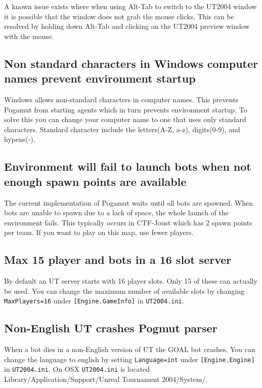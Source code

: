 \documentclass[11pt,a4paper]{article}
\begin{document}
A known issue exists where when using Alt-Tab to switch to the UT2004 window it is possible that the window does not grab the mouse clicks. This can be resolved by holding down Alt-Tab and clicking on the UT2004 preview window with the mouse.

\subsection{Non standard characters in Windows computer names prevent environment startup}

Windows allows non-standard characters in computer names. This prevents Pogamut from starting agents which in turn prevents environment startup. To solve this you can change your computer name to one that uses only standard characters. Standard character include the letters(A-Z, a-z), digits(0-9), and hypens(-).

\subsection{Environment will fail to launch bots when not enough spawn points are available}

The current implementation of Pogamut waits until all bots are spawned. When bots are unable to spawn due to a lack of space, the whole launch of the environment fails. This typically occurs in CTF-Joust which has 2 spawn points per team. If you want to play on this map, use fewer players.

\subsection{Max 15 player and bots in a 16 slot server}

By default an UT server starts with 16 player slots. Only 15 of these can actually be used. You can change the maximum number of available slots by changing \verb|MaxPlayers=16| under \verb|[Engine.GameInfo]| in \verb|UT2004.ini|.

\subsection{Non-English UT crashes Pogmut parser}

When a bot dies in a non-English version of UT the GOAL bot crashes. You can change the language to english by setting \verb|Language=int| under \verb|[Engine.Engine]| in \verb|UT2004.ini|. On OSX \verb|UT2004.ini| is located Library/Application/Support/Unreal Tournament 2004/System/.
\end{document}
